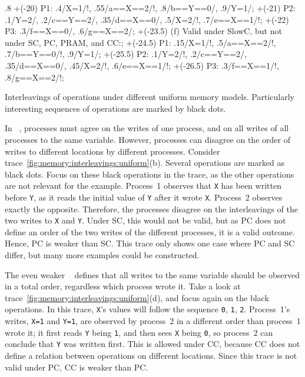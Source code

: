 \begin{parcodes}[t]
\begin{parfig}{.8\linewidth}
	\memops		+(-20)		{P1}: {.4/X=1/!, .55/a==X==2/!, .8/b==Y==0/, .9/Y=1/};
	\memops		+(-21)		{P2}: {.1/Y=2/, .2/c==Y==2/, .35/d==X==0/, .5/X=2/!, .7/e==X==1/!};
	\memops		+(-22)		{P3}: {.3/f==X==0/, .6/g==X==2/};
	\memlabel	+(-23.5)	{(f) Valid under \acs*{SlowC}, but not under \acs{SC}, \acs{PC}, \acs{PRAM}, and \acs{CC}:};
	\memops		+(-24.5)	{P1}: {.15/X=1/!, .5/a==X==2/!, .7/b==Y==0/!, .9/Y=1/};
	\memops		+(-25.5)	{P2}: {.1/Y=2/!, .2/c==Y==2/, .35/d==X==0/, .45/X=2/!, .6/e==X==1/!};
	\memops		+(-26.5)	{P3}: {.3/f==X==1/!, .8/g==X==2/!};
\end{parfig}%
\caption{Interleavings of operations under different uniform memory models.
	Particularly interesting sequences of operations are marked by black dots.}%
\label{fig:memory:interleavings:uniform}%
\end{parcodes}

In ~\cite{ahamad:processor_consistency,mosberger:memory_models}, processes must agree on the writes of one process, and on all writes of all processes to the same variable.
However, processes can disagree on the order of writes to different locations by different processes.
Consider trace~\ref{fig:memory:interleavings:uniform}(b).
Several operations are marked as black dots.
Focus on these black operations in the trace, as the other operations are not relevant for the example.
Process~1 observes that \lstinline|X| has been written before \lstinline|Y|, as it reads the initial value of \lstinline|Y| after it wrote \lstinline|X|.
Process~2 observes exactly the opposite.
Therefore, the processes disagree on the interleavings of the two writes to \lstinline|X| and \lstinline|Y|.
Under \ac{SC}, this would not be valid, but as \ac{PC} does not define an order of the two writes of the different processes, it is a valid outcome.
Hence, \ac{PC} is weaker than \ac{SC}.
This trace only shows one case where \ac{PC} and \ac{SC} differ, but many more examples could be constructed.

The even weaker ~\cite{steinke:unified} defines that all writes to the same variable should be observed in a total order, regardless which process wrote it.
Take a look at trace~\ref{fig:memory:interleavings:uniform}(d), and focus again on the black operations.
In this trace, \lstinline|X|'s values will follow the sequence \lstinline|0|, \lstinline|1|, \lstinline|2|.
Process~1's writes, \lstinline|X=1| and \lstinline|Y=1|, are observed by process~2 in a different order than process~1 wrote it; it first reads \lstinline|Y| being \lstinline|1|, and then sees \lstinline|X| being \lstinline|0|, so process~2 can conclude that \lstinline|Y| was written first.
This is allowed under \ac{CC}, because \ac{CC} does not define a relation between operations on different locations.
Since this trace is not valid under \ac{PC}, \ac{CC} is weaker than \ac{PC}.

